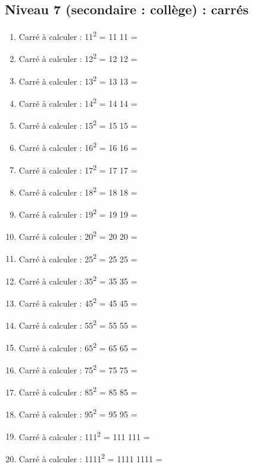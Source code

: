 \documentclass[11pt]{article}
\begin{document}
\newpage


\subsection{Niveau 7 (secondaire : collège) : carrés}
\label{sec:org561b501}


\label{org529dbcb}


\begin{enumerate}
\item Carré à calculer :  11\textsuperscript{2} = 11 \texttimes{} 11 =
\item Carré à calculer :  12\textsuperscript{2} = 12 \texttimes{} 12 =
\item Carré à calculer :  13\textsuperscript{2} = 13 \texttimes{} 13 =
\item Carré à calculer :  14\textsuperscript{2} = 14 \texttimes{} 14 =
\item Carré à calculer :  15\textsuperscript{2} = 15 \texttimes{} 15 =
\item Carré à calculer :  16\textsuperscript{2} = 16 \texttimes{} 16 =
\item Carré à calculer :  17\textsuperscript{2} = 17 \texttimes{} 17 =
\item Carré à calculer :  18\textsuperscript{2} = 18 \texttimes{} 18 =
\item Carré à calculer :  19\textsuperscript{2} = 19 \texttimes{} 19 =
\item Carré à calculer :  20\textsuperscript{2} = 20 \texttimes{} 20 =
\item Carré à calculer :  25\textsuperscript{2} = 25 \texttimes{} 25 =
\item Carré à calculer :  35\textsuperscript{2} = 35 \texttimes{} 35 =
\item Carré à calculer :  45\textsuperscript{2} = 45 \texttimes{} 45 =
\item Carré à calculer :  55\textsuperscript{2} = 55 \texttimes{} 55 =
\item Carré à calculer :  65\textsuperscript{2} = 65 \texttimes{} 65 =
\item Carré à calculer :  75\textsuperscript{2} = 75 \texttimes{} 75 =
\item Carré à calculer :  85\textsuperscript{2} = 85 \texttimes{} 85 =
\item Carré à calculer :  95\textsuperscript{2} = 95 \texttimes{} 95 =
\item Carré à calculer :  111\textsuperscript{2} = 111 \texttimes{} 111 =
\item Carré à calculer :  1111\textsuperscript{2} = 1111 \texttimes{} 1111 =
\end{enumerate}
\end{document}

